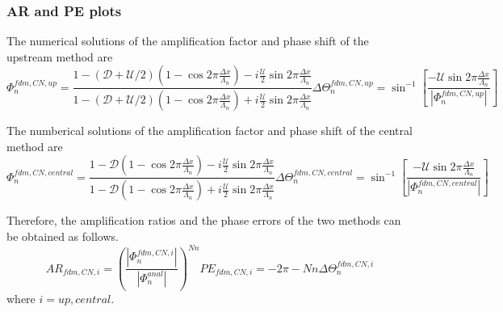 \subsubsection{AR and PE plots}
The numerical solutions of the amplification factor and phase shift of the upstream method are
\begin{subequations}
  \begin{equation}
    \label{eq:11a}
    \Phi_n^{fdm,CN,up} = \frac{1-(\mathcal{D}+\mathcal{U}/2)(1-\cos{2\pi \frac{\Delta x}{\Lambda_n}}) - i\frac{\mathcal{U}}{2}\sin{2\pi \frac{\Delta x}{\Lambda_n}}}{1-(\mathcal{D}+\mathcal{U}/2)(1-\cos{2\pi \frac{\Delta x}{\Lambda_n}}) + i\frac{\mathcal{U}}{2}\sin{2\pi \frac{\Delta x}{\Lambda_n}}}
  \end{equation}
  \begin{equation}
    \label{eq:11b}
    \Delta \Theta_n^{fdm,CN,up} = \sin^{-1}[\frac{-\mathcal{U}\sin{2\pi\frac{\Delta x}{\Lambda_n}}}{|\Phi_n^{fdm,CN,up}|}]
  \end{equation}
\end{subequations}

The numberical solutions of the amplification factor and phase shift of the central method are
\begin{subequations}
  \begin{equation}
    \label{eq:12a}
    \Phi_n^{fdm,CN,central} = \frac{1-\mathcal{D}(1-\cos{2\pi \frac{\Delta x}{\Lambda_n}}) - i\frac{\mathcal{U}}{2}\sin{2\pi \frac{\Delta x}{\Lambda_n}}}{1-\mathcal{D}(1-\cos{2\pi \frac{\Delta x}{\Lambda_n}}) + i\frac{\mathcal{U}}{2}\sin{2\pi \frac{\Delta x}{\Lambda_n}}}
  \end{equation}
  \begin{equation}
    \label{eq:12b}
    \Delta \Theta_n^{fdm,CN,central} = \sin^{-1}[\frac{-\mathcal{U}\sin{2\pi\frac{\Delta x}{\Lambda_n}}}{|\Phi_n^{fdm,CN,central}|}]
  \end{equation}
\end{subequations}

Therefore, the amplification ratios and the phase errors of the two methods can be obtained as follows.
\begin{subequations}
  \begin{equation}
    \label{eq:13a}
    AR_{fdm,CN,i} = (\frac{|\Phi_n^{fdm,CN,i}|}{|\Phi_n^{anal}|})^{Nn}
  \end{equation}
  \begin{equation}
    \label{eq:13b}
    PE_{fdm,CN,i} = -2\pi-Nn\Delta \Theta_n^{fdm,CN,i}
  \end{equation}
\end{subequations}
where $i=up,central$.


